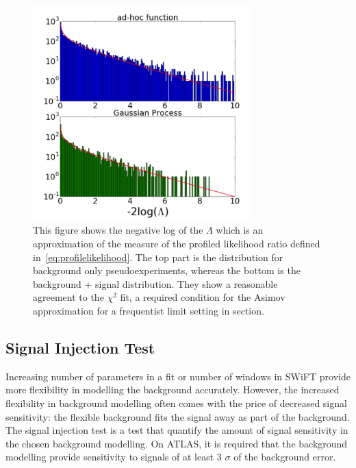     \begin{figure}[!htb]
        \begin{center}
            \includegraphics[width=0.75\textwidth]{figures/chapter_analysismethod/chi2}
                \caption{
                This figure shows the negative log of the $\Lambda$ which is an approximation of the measure of the profiled likelihood ratio defined in~\ref{eq:profilelikelihood}. The top part is the distribution for background only pseudoexperiments, whereas the bottom is the background + signal distribution. They show a reasonable agreement to the $\chi^{2}$ fit, a required condition for the Asimov approximation for a frequentist limit setting in
            section\cite{frate2017modelling}. }
            \label{fig:chi2}
        \end{center}
    \end{figure}




    \subsection{Signal Injection Test}
    Increasing number of parameters in a fit or number of windows in SWiFT provide more flexibility in modelling the background accurately. However, the increased flexibility in background modelling often comes with the price of decreased signal sensitivity: the flexible background fits the signal away as part of the background. The signal injection test is a test that quantify the amount of signal sensitivity in the chosen background modelling. On ATLAS, it is required that the background modelling provide sensitivity to signals of at least 3 $\sigma$ of the background error. 

